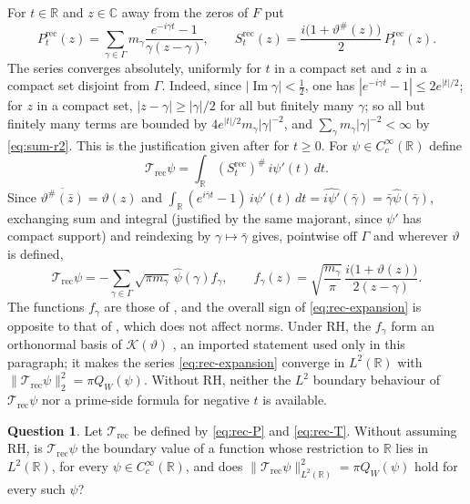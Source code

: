 \documentclass[11pt]{amsart}
\theoremstyle{plain}
\theoremstyle{definition}
\newtheorem{question}[theorem]{Question}
\theoremstyle{remark}
\numberwithin{equation}{section}
\newcommand{\C}{\mathbb{C}}
\newcommand{\R}{\mathbb{R}}
\DeclareMathOperator{\Ima}{Im}
\renewcommand{\Im}{\Ima}
\begin{document}
For $t\in\R$ and $z\in\C$ away from the zeros of $F$ put
\begin{equation}\label{eq:rec-P}
P_t^{\mathrm{rec}}(z)=\sum_{\gamma\in\Gamma}m_\gamma
\frac{e^{-i\gamma t}-1}{\gamma(z-\gamma)},\qquad
S_t^{\mathrm{rec}}(z)=\frac{i\bigl(1+\vartheta^\#(z)\bigr)}{2}\,
P_t^{\mathrm{rec}}(z).
\end{equation}
The series converges absolutely, uniformly for $t$ in a compact set and
$z$ in a compact set disjoint from $\Gamma$. Indeed, since
$|\Im\gamma|<\tfrac12$, one has $|e^{-i\gamma t}-1|\le2e^{|t|/2}$; for
$z$ in a compact set, $|z-\gamma|\ge|\gamma|/2$ for all but finitely
many $\gamma$; so all but finitely many terms are bounded by
$4e^{|t|/2}m_\gamma|\gamma|^{-2}$, and
$\sum_\gamma m_\gamma|\gamma|^{-2}<\infty$ by \eqref{eq:sum-r2}. This is
the justification given after \cite[(3.2), p.~7]{Suzuki2023WeilHilbert}
for $t\ge0$.
For $\psi\in C_c^\infty(\R)$ define
\begin{equation}\label{eq:rec-T}
\mathcal T_{\mathrm{rec}}\psi
=\int_\R(S_t^{\mathrm{rec}})^\#\,i\psi'(t)\,dt .
\end{equation}
Since $\overline{\vartheta^\#(\bar z)}=\vartheta(z)$ and
$\int_\R(e^{i\bar\gamma t}-1)\,i\psi'(t)\,dt
=\widehat{i\psi'}(\bar\gamma)=\bar\gamma\widehat\psi(\bar\gamma)$,
exchanging sum and integral (justified by the same majorant, since
$\psi'$ has compact support) and reindexing by
$\gamma\mapsto\bar\gamma$ gives, pointwise off $\Gamma$ and wherever
$\vartheta$ is defined,
\begin{equation}\label{eq:rec-expansion}
\mathcal T_{\mathrm{rec}}\psi
=-\sum_{\gamma\in\Gamma}\sqrt{\pi m_\gamma}\,\widehat\psi(\gamma)
f_\gamma,\qquad
f_\gamma(z)=\sqrt{\frac{m_\gamma}{\pi}}\,
\frac{i\bigl(1+\vartheta(z)\bigr)}{2(z-\gamma)} .
\end{equation}
The functions $f_\gamma$ are those of \cite[(3.5), p.~10]%
{Suzuki2023WeilHilbert}, and the overall sign of
\eqref{eq:rec-expansion} is opposite to that of \cite[(3.8), p.~10]%
{Suzuki2023WeilHilbert}, which does not affect norms. Under RH, the
$f_\gamma$ form an orthonormal basis of $\mathcal K(\vartheta)$
\cite[Proposition~4.1, p.~10]{Suzuki2023WeilHilbert}, an imported
statement used only in this paragraph; it makes the series
\eqref{eq:rec-expansion} converge in $L^2(\R)$ with
$\|\mathcal T_{\mathrm{rec}}\psi\|_2^2=\pi Q_W(\psi)$. Without RH,
neither the $L^2$ boundary behaviour of $\mathcal T_{\mathrm{rec}}\psi$
nor a prime-side formula for negative $t$ is available.

\begin{question}\label{q:reconstruction}
Let $\mathcal T_{\mathrm{rec}}$ be defined by \eqref{eq:rec-P} and
\eqref{eq:rec-T}. Without assuming RH, is $\mathcal T_{\mathrm{rec}}\psi$
the boundary value of a function whose restriction to $\R$ lies in
$L^2(\R)$, for every $\psi\in C_c^\infty(\R)$, and does
$\|\mathcal T_{\mathrm{rec}}\psi\|_{L^2(\R)}^2=\pi Q_W(\psi)$ hold for
every such $\psi$?
\end{question}
\end{document}
